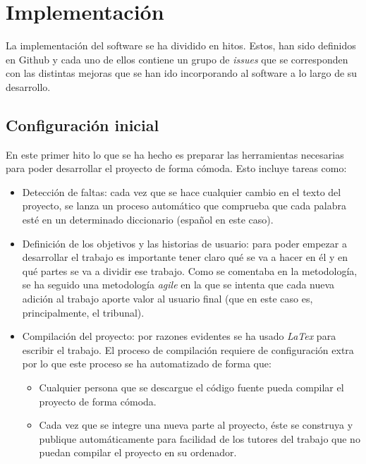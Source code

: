 \chapter{Implementación}

La implementación del software se ha dividido en hitos. Estos, han sido definidos en Github
y cada uno de ellos contiene un grupo de \textit{issues} que se corresponden con las distintas
mejoras que se han ido incorporando al software a lo largo de su desarrollo.

\section{Configuración inicial}

En este primer hito lo que se ha hecho es preparar las herramientas necesarias para poder desarrollar
el proyecto de forma cómoda. Esto incluye tareas como:

\begin{itemize}
  \item Detección de faltas: cada vez que se hace cualquier cambio en el texto del proyecto, se lanza un proceso
  automático que comprueba que cada palabra esté en un determinado diccionario (español en este caso).
  \item Definición de los objetivos y las historias de usuario: para poder empezar a desarrollar el trabajo es importante
  tener claro qué se va a hacer en él y en qué partes se va a dividir ese trabajo. Como se comentaba en la metodología, se
  ha seguido una metodología \textit{agile} en la que se intenta que cada nueva adición al trabajo aporte valor al usuario final
  (que en este caso es, principalmente, el tribunal).
  \item Compilación del proyecto: por razones evidentes se ha usado \textit{LaTex} para escribir el trabajo. El proceso de compilación
  requiere de configuración extra por lo que este proceso se ha automatizado de forma que:
  \begin{itemize}
    \item Cualquier persona que se descargue el código fuente pueda compilar el proyecto de forma cómoda.
    \item Cada vez que se integre una nueva parte al proyecto, éste se construya y publique automáticamente para facilidad de los tutores
    del trabajo que no puedan compilar el proyecto en su ordenador.
  \end{itemize}
\end{itemize}

